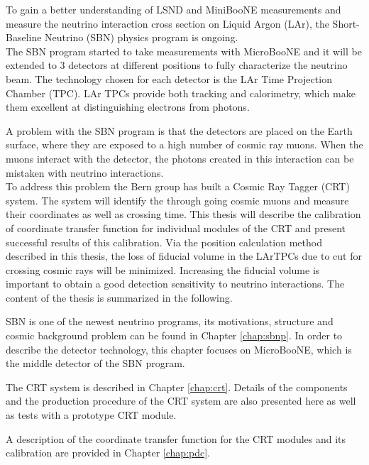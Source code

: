 \documentclass[a4paper]{article}\linespread{1.4}
\begin{document}
To gain a better understanding of LSND and MiniBooNE measurements and measure the neutrino interaction cross section on Liquid Argon (LAr), the Short-Baseline Neutrino (SBN) physics program is ongoing. 
\\The SBN program started to take measurements with MicroBooNE and it will be extended to 3 detectors at different positions to fully characterize the neutrino beam. The technology chosen for each detector is the LAr Time Projection Chamber (TPC). LAr TPCs provide both tracking and calorimetry, which make them excellent at distinguishing electrons from photons.

A problem with the SBN program is that the detectors are placed on the Earth surface, where they are exposed to a high number of cosmic ray muons. When the muons interact with the detector, the photons created in this interaction can be mistaken with neutrino interactions.
\\To address this problem the Bern group has built a Cosmic Ray Tagger (CRT) system. The system will identify the through going cosmic muons and measure their coordinates as well as crossing time. This thesis will describe the calibration of coordinate transfer function for individual modules of the CRT and present successful results of this calibration. 
Via the position calculation method described in this thesis, the loss of fiducial volume in the LArTPCs due to cut for crossing cosmic rays will be minimized. Increasing the fiducial volume is important to obtain a good detection sensitivity to neutrino interactions.
The content of the thesis is summarized in the following.


SBN is one of the newest neutrino programs, its motivations, structure and cosmic background problem can be found in Chapter \ref{chap:sbnp}. In order to describe the detector technology, this chapter focuses on MicroBooNE, which is the middle detector of the SBN program.

The CRT system is described in Chapter \ref{chap:crt}. Details of the components and the production procedure of the CRT system are also presented here as well as tests with a prototype CRT module. 

A description of the coordinate transfer function for the CRT modules and its calibration are provided in Chapter \ref{chap:pdc}.
\end{document}
